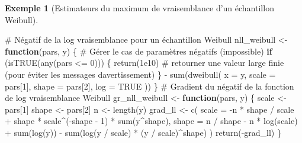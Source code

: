 \documentclass[
  11pt,
  letterpaper,
]{scrbook}
\newenvironment{Shaded}{\begin{snugshade}}{\end{snugshade}}
\newcommand{\AttributeTok}[1]{\textcolor[rgb]{0.40,0.45,0.13}{#1}}
\newcommand{\CommentTok}[1]{\textcolor[rgb]{0.37,0.37,0.37}{#1}}
\newcommand{\ConstantTok}[1]{\textcolor[rgb]{0.56,0.35,0.01}{#1}}
\newcommand{\ControlFlowTok}[1]{\textcolor[rgb]{0.00,0.23,0.31}{\textbf{#1}}}
\newcommand{\DecValTok}[1]{\textcolor[rgb]{0.68,0.00,0.00}{#1}}
\newcommand{\FloatTok}[1]{\textcolor[rgb]{0.68,0.00,0.00}{#1}}
\newcommand{\FunctionTok}[1]{\textcolor[rgb]{0.28,0.35,0.67}{#1}}
\newcommand{\NormalTok}[1]{\textcolor[rgb]{0.00,0.23,0.31}{#1}}
\newcommand{\OtherTok}[1]{\textcolor[rgb]{0.00,0.23,0.31}{#1}}
\newcommand{\SpecialCharTok}[1]{\textcolor[rgb]{0.37,0.37,0.37}{#1}}
\theoremstyle{definition}
\newtheorem{example}{Exemple}[chapter]
\theoremstyle{definition}
\theoremstyle{plain}
\theoremstyle{plain}
\theoremstyle{remark}
\begin{document}
\begin{example}[Estimateurs du maximum de vraisemblance d'un échantillon
Weibull]
\begin{Shaded}
\begin{Highlighting}[]
\CommentTok{\# Négatif de la log vraisemblance pour un échantillon Weibull}
\NormalTok{nll\_weibull }\OtherTok{\textless{}{-}} \ControlFlowTok{function}\NormalTok{(pars, y) \{}
  \CommentTok{\# Gérer le cas de paramètres négatifs (impossible)}
  \ControlFlowTok{if}\NormalTok{ (}\FunctionTok{isTRUE}\NormalTok{(}\FunctionTok{any}\NormalTok{(pars }\SpecialCharTok{\textless{}=} \DecValTok{0}\NormalTok{))) \{}
    \FunctionTok{return}\NormalTok{(}\FloatTok{1e10}\NormalTok{) }\CommentTok{\# retourner une valeur large finie (pour éviter les messages d\textquotesingle{}avertissement)}
\NormalTok{  \}}
  \SpecialCharTok{{-}} \FunctionTok{sum}\NormalTok{(}\FunctionTok{dweibull}\NormalTok{(}
    \AttributeTok{x =}\NormalTok{ y,}
    \AttributeTok{scale =}\NormalTok{ pars[}\DecValTok{1}\NormalTok{],}
    \AttributeTok{shape =}\NormalTok{ pars[}\DecValTok{2}\NormalTok{],}
    \AttributeTok{log =} \ConstantTok{TRUE}
\NormalTok{  ))}
\NormalTok{\}}
\CommentTok{\# Gradient du négatif de la fonction de log vraisemblance Weibull}
\NormalTok{gr\_nll\_weibull }\OtherTok{\textless{}{-}} \ControlFlowTok{function}\NormalTok{(pars, y) \{}
\NormalTok{  scale }\OtherTok{\textless{}{-}}\NormalTok{ pars[}\DecValTok{1}\NormalTok{]}
\NormalTok{  shape }\OtherTok{\textless{}{-}}\NormalTok{ pars[}\DecValTok{2}\NormalTok{]}
\NormalTok{  n }\OtherTok{\textless{}{-}} \FunctionTok{length}\NormalTok{(y)}
\NormalTok{  grad\_ll }\OtherTok{\textless{}{-}} \FunctionTok{c}\NormalTok{(}
    \AttributeTok{scale =} \SpecialCharTok{{-}}\NormalTok{n }\SpecialCharTok{*}\NormalTok{ shape }\SpecialCharTok{/}\NormalTok{ scale }\SpecialCharTok{+}\NormalTok{ shape }\SpecialCharTok{*}\NormalTok{ scale}\SpecialCharTok{\^{}}\NormalTok{(}\SpecialCharTok{{-}}\NormalTok{shape }\SpecialCharTok{{-}} \DecValTok{1}\NormalTok{) }\SpecialCharTok{*} \FunctionTok{sum}\NormalTok{(y}\SpecialCharTok{\^{}}\NormalTok{shape),}
    \AttributeTok{shape =}\NormalTok{ n }\SpecialCharTok{/}\NormalTok{ shape }\SpecialCharTok{{-}}\NormalTok{ n }\SpecialCharTok{*} \FunctionTok{log}\NormalTok{(scale) }\SpecialCharTok{+} \FunctionTok{sum}\NormalTok{(}\FunctionTok{log}\NormalTok{(y)) }\SpecialCharTok{{-}}
      \FunctionTok{sum}\NormalTok{(}\FunctionTok{log}\NormalTok{(y }\SpecialCharTok{/}\NormalTok{ scale) }\SpecialCharTok{*}\NormalTok{ (y }\SpecialCharTok{/}\NormalTok{ scale)}\SpecialCharTok{\^{}}\NormalTok{shape)}
\NormalTok{  )}
  \FunctionTok{return}\NormalTok{(}\SpecialCharTok{{-}}\NormalTok{grad\_ll)}
\NormalTok{\}}


\end{Highlighting}
\end{Shaded}
\end{example}
\end{document}
